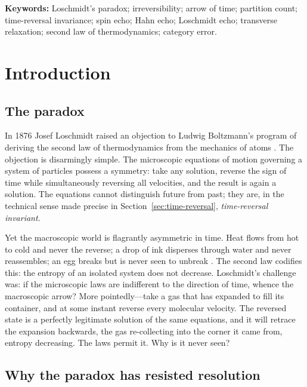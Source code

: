 \documentclass[11pt,a4paper]{article}
\theoremstyle{thmstyle}
\theoremstyle{definition}
\theoremstyle{remark}
\begin{document}
\noindent\textbf{Keywords:} Loschmidt's paradox; irreversibility; arrow
of time; partition count; time-reversal invariance; spin echo; Hahn
echo; Loschmidt echo; transverse relaxation; second law of
thermodynamics; category error.

\tableofcontents

\section{Introduction}
\label{sec:intro}

\subsection{The paradox}
\label{sec:the-paradox}

In 1876 Josef Loschmidt raised an objection to Ludwig Boltzmann's
program of deriving the second law of thermodynamics from the mechanics
of atoms \citep{loschmidt1876,loschmidt1877}. The objection is
disarmingly simple. The microscopic equations of motion governing a
system of particles possess a symmetry: take any solution, reverse the
sign of time while simultaneously reversing all velocities, and the
result is again a solution. The equations cannot distinguish future from
past; they are, in the technical sense made precise in
Section~\ref{sec:time-reversal}, \emph{time-reversal invariant}.

Yet the macroscopic world is flagrantly asymmetric in time. Heat flows
from hot to cold and never the reverse; a drop of ink disperses through
water and never reassembles; an egg breaks but is never seen to unbreak
\citep{eddington1928}. The second law codifies this: the entropy of an
isolated system does not decrease. Loschmidt's challenge was: if the
microscopic laws are indifferent to the direction of time, whence the
macroscopic arrow? More pointedly---take a gas that has expanded to fill
its container, and at some instant reverse every molecular velocity. The
reversed state is a perfectly legitimate solution of the same equations,
and it will retrace the expansion backwards, the gas re-collecting into
the corner it came from, entropy decreasing. The laws permit it. Why is
it never seen?

\subsection{Why the paradox has resisted resolution}
\label{sec:why-resisted}
\end{document}
